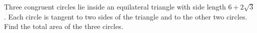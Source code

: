 Three congruent circles lie inside an equilateral triangle with side length $6+2\sqrt3$. Each circle is tangent to two sides of the triangle and to the other two circles. Find the total area of the three circles.
